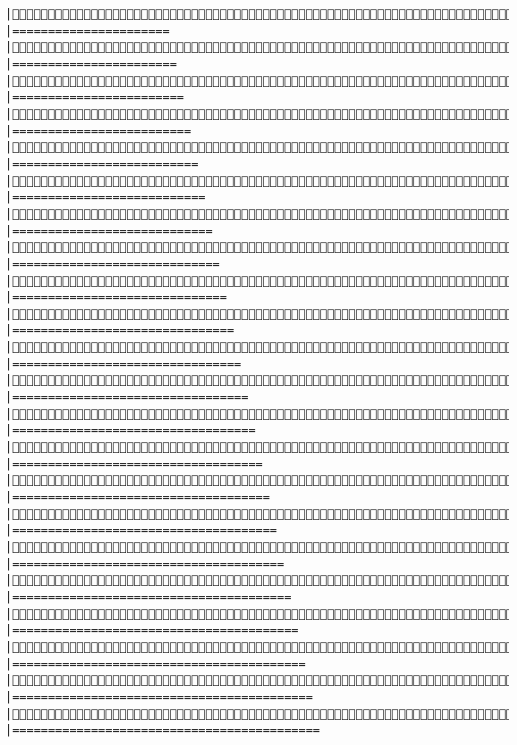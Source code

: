 \documentclass[]{article}
\begin{document}
\begin{verbatim}
|Simulating: |======================                                       |Simulating: |=======================                                      |Simulating: |========================                                     |Simulating: |=========================                                    |Simulating: |==========================                                   |Simulating: |===========================                                  |Simulating: |============================                                 |Simulating: |=============================                                |Simulating: |==============================                               |Simulating: |===============================                              |Simulating: |================================                             |Simulating: |=================================                            |Simulating: |==================================                           |Simulating: |===================================                          |Simulating: |====================================                         |Simulating: |=====================================                        |Simulating: |======================================                       |Simulating: |=======================================                      |Simulating: |========================================                     |Simulating: |=========================================                    |Simulating: |==========================================                   |Simulating: |===========================================                  
\end{verbatim}
\end{document}
